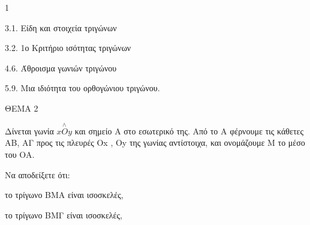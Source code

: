 \begin{ylh}{1}
    \item 3.1. Είδη και στοιχεία τριγώνων
    \item 3.2. 1ο Κριτήριο ισότητας τριγώνων
    \item 4.6. Άθροισμα γωνιών τριγώνου
    \item 5.9. Μια ιδιότητα του ορθογώνιου τριγώνου.
\end{ylh}

ΘΕΜΑ 2

Δίνεται γωνία $\overset{\land}{xOy}$ και σημείο Α στο εσωτερικό της. Από το Α φέρνουμε τις κάθετες ΑΒ, ΑΓ προς τις πλευρές Οx , Oy της γωνίας αντίστοιχα, και ονομάζουμε Μ το μέσο του ΟΑ.

Να αποδείξετε ότι:

\begin{alist}
\item το τρίγωνο ΒΜΑ είναι ισοσκελές, 

\item το τρίγωνο ΒΜΓ είναι ισοσκελές, 

\begin{center}
\end{center}
\end{alist}
